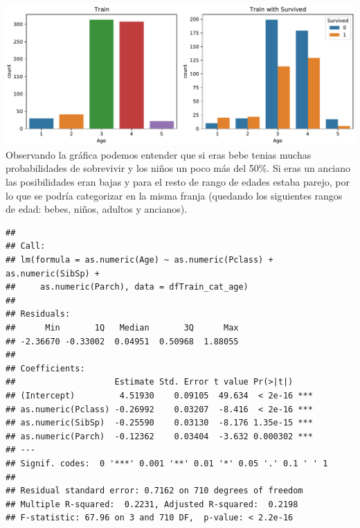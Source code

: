 \documentclass[
]{article}
\newenvironment{Shaded}{\begin{snugshade}}{\end{snugshade}}
\newcommand{\DataTypeTok}[1]{\textcolor[rgb]{0.87,0.87,0.75}{#1}}
\newcommand{\KeywordTok}[1]{\textcolor[rgb]{0.94,0.87,0.69}{#1}}
\newcommand{\NormalTok}[1]{\textcolor[rgb]{0.80,0.80,0.80}{#1}}
\newcommand{\OperatorTok}[1]{\textcolor[rgb]{0.94,0.94,0.82}{#1}}
\newcommand{\StringTok}[1]{\textcolor[rgb]{0.80,0.58,0.58}{#1}}
\begin{document}
\includegraphics{m2851_PRA2_aruizplaza_rcotillas_files/figure-latex/unnamed-chunk-21-1.pdf}
Observando la gráfica podemos entender que si eras bebe tenias muchas
probabilidades de sobrevivir y los niños un poco más del 50\%. Si eras
un anciano las posibilidades eran bajas y para el resto de rango de
edades estaba parejo, por lo que se podría categorizar en la misma
franja (quedando los siguientes rangos de edad: bebes, niños, adultos y
ancianos).

\begin{Shaded}
\end{Shaded}

\begin{verbatim}
## 
## Call:
## lm(formula = as.numeric(Age) ~ as.numeric(Pclass) + as.numeric(SibSp) + 
##     as.numeric(Parch), data = dfTrain_cat_age)
## 
## Residuals:
##      Min       1Q   Median       3Q      Max 
## -2.36670 -0.33002  0.04951  0.50968  1.88055 
## 
## Coefficients:
##                    Estimate Std. Error t value Pr(>|t|)    
## (Intercept)         4.51930    0.09105  49.634  < 2e-16 ***
## as.numeric(Pclass) -0.26992    0.03207  -8.416  < 2e-16 ***
## as.numeric(SibSp)  -0.25590    0.03130  -8.176 1.35e-15 ***
## as.numeric(Parch)  -0.12362    0.03404  -3.632 0.000302 ***
## ---
## Signif. codes:  0 '***' 0.001 '**' 0.01 '*' 0.05 '.' 0.1 ' ' 1
## 
## Residual standard error: 0.7162 on 710 degrees of freedom
## Multiple R-squared:  0.2231, Adjusted R-squared:  0.2198 
## F-statistic: 67.96 on 3 and 710 DF,  p-value: < 2.2e-16
\end{verbatim}
\end{document}
